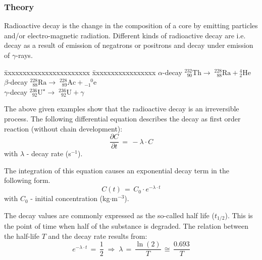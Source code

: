 \subsubsection*{Theory}

Radioactive decay is the change in the composition of a core by emitting particles and/or electro-magnetic radiation. Different kinds of radioactive decay are i.e. decay as a result of emission of negatrons or positrons and decay under emission of $\gamma$-rays.

\begin{tabbing}
\=xxxxxxxxxxxxxxxxxxxxxxx \=xxxxxxxxxxxxxxxxx \kill
\> $\alpha$-decay
\> ${^{232}_{\phantom{2}90}}\mathrm{Th}\rightarrow\;{^{228}_{\phantom{2}88}}\mathrm{Ra}+{^{4}_{2}}\mathrm{He}$ \\[1.5ex]
\> $\beta$-decay
\> ${^{228}_{\phantom{2}88}}\mathrm{Ra}\rightarrow\;{^{228}_{\phantom{2}89}}\mathrm{Ac}+{^{\phantom{-}0}_{-1}}\mathrm{e}$ \\[1.5ex]
\> $\gamma$-decay
\> ${^{236}_{\phantom{2}92}}\mathrm{U}^{\star}\rightarrow\;{^{236}_{\phantom{2}92}}\mathrm{U}+\gamma$
\end{tabbing}

The above given examples show that the radioactive decay is an irreversible process. The following differential equation describes the decay as first order reaction (without chain development):
\begin{equation}
\frac{\partial C}{\partial t}\,=\,-\lambda\cdot C
\label{eq55}
\end{equation}
{\small
with $\lambda$ - decay rate (s$^{-1}$).
}

The integration of this equation causes an exponential decay term in the following form.
\begin{equation}
C(t)\,=\,C_0\cdot e^{-\lambda\cdot t}
\label{eq56}
\end{equation}
{\small
with $C_0$ - initial concentration (kg$\cdot$m$^{-3}$).
}

The decay values are commonly expressed as the so-called half life ($t_{1/2}$). This is the point of time when half of the substance is degraded. The relation between the half-life $T$ and the decay rate results from:
\begin{equation}
e^{-\lambda\cdot t}\,=\,\frac{1}{2}\;\Rightarrow\;
\lambda\,=\,\frac{\ln(2)}{T}\,\cong\,\frac{0.693}{T}
\label{eq57}
\end{equation}
